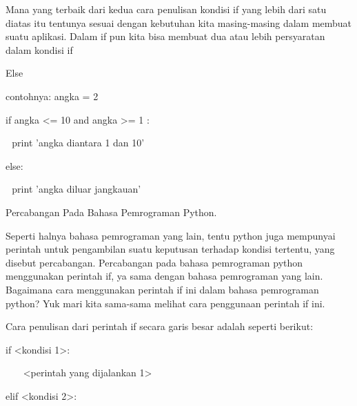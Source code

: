 \vspace{\baselineskip}
Mana yang terbaik dari kedua cara penulisan kondisi if yang lebih dari satu diatas itu tentunya sesuai dengan kebutuhan kita masing-masing dalam membuat suatu aplikasi. Dalam if pun kita bisa membuat dua atau lebih persyaratan dalam kondisi if \par
\noindent 
\vspace{\baselineskip}
\vspace{\baselineskip}
Else \par
\noindent 
\vspace{\baselineskip}
contohnya:\vspace{\baselineskip}
angka = 2 \par
\noindent 
\vspace{\baselineskip}
if angka <= 10 and angka >= 1 : \par
\noindent 
\vspace{\baselineskip}
 $  $  $  $ print 'angka diantara 1 dan 10' \par
\noindent 
\vspace{\baselineskip}
else: \par
\noindent 
\vspace{\baselineskip}
 $  $  $  $ print 'angka diluar jangkauan' \par
\vspace{12pt}
\noindent 
Percabangan Pada Bahasa Pemrograman Python. \par
\vspace{12pt}
\noindent 
Seperti halnya bahasa pemrograman yang lain, tentu python juga mempunyai perintah untuk pengambilan suatu keputusan terhadap kondisi tertentu, yang disebut percabangan. Percabangan pada bahasa pemrograman python menggunakan perintah $  $if, ya sama dengan bahasa pemrograman yang lain. Bagaimana cara menggunakan perintah $  $if $  $ini dalam bahasa pemrograman python? Yuk mari kita sama-sama melihat cara penggunaan perintah $  $if $  $ini. \par
\vspace{12pt}
\noindent 
Cara penulisan dari perintah if secara garis besar adalah seperti berikut: \par
\noindent 
if <kondisi 1>: \par
\vspace{12pt}
\noindent 
~~~ <perintah yang dijalankan 1> \par
\vspace{12pt}
\noindent 
elif <kondisi 2>: \par
\vspace{12pt}

